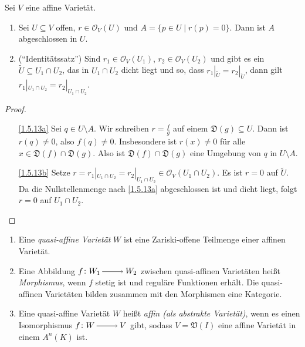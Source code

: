 \documentclass[a4paper,12pt]{scrbook}
\newtheorem{proof}{Beweis}
\def\V{\mathfrak{V}}
\def\O{\mathcal{O}}
\newcommand{\D}{\mathfrak{D}}
\newcommand{\restrict}[1]{|_{#1}}
\newcommand{\ra}{\raisebox{-1pt}{\tikz{\draw[thin,shorten >=3pt, ->] (0,0) node{\hspace*{-2pt}} -- node{} (1,0);}}\penalty1000\relax}
\begin{document}
\begin{bem}\label{1.5.13}
  Sei $V$ eine affine Varietät.
  \begin{enumerate}
  \item{} Sei $U\subseteq V$ offen, $r\in\O_V(U)$ und $A=\{p\in U\mid r(p)=0\}$. Dann ist $A$ abgeschlossen in $U$.
  \item{} (\enquote{Identitätssatz}) Sind $r_1\in\O_V(U_1)$, $r_2\in\O_V(U_2)$ und gibt es ein $\tilde{U}\subseteq
    U_1\cap U_2$, das in $U_1\cap U_2$ dicht liegt und so, dass $r_1\restrict{\tilde{U}}=r_2\restrict{\tilde{U}}$, dann gilt
    $r_1\restrict{U_1\cap U_2}=r_2\restrict{U_1\cap U_2}$.
  \end{enumerate}
\end{bem}
\begin{proof}
  \begin{enumerate}
  \item[\ref{1.5.13a}] Sei $q\in U\setminus A$. Wir schreiben $r=\frac{f}{g}$ auf einem $\D(g)\subseteq U$. Dann ist $r(q)\neq0$,
    also $f(q)\neq0$. Insbesondere ist $r(x)\neq0$ für alle $x\in \D(f)\cap \D(g)$. Also ist $\D(f)\cap \D(g)$ eine Umgebung von $q$
    in $U\setminus A$.
  \item[\ref{1.5.13b}] Setze $r=r_1\restrict{U_1\cap U_2}=r_2\restrict{U_1\cap U_2}\in \O_V(U_1\cap U_2)$. Es ist $r=0$ auf
    $\tilde{U}$. Da die Nullstellenmenge nach \ref{1.5.13a} abgeschlossen ist und dicht liegt, folgt $r=0$ auf $U_1\cap U_2$.
  \end{enumerate}
\end{proof}

\begin{db}\label{1.5.14}
  \begin{enumerate}
  \item{} Eine \emph{quasi-affine Varietät} $W$ ist eine Zariski-offene Teilmenge einer affinen Varietät.
  \item{} Eine Abbildung $f\colon W_1\ra W_2$ zwischen quasi-affinen Varietäten heißt \emph{Morphismus}, wenn $f$
    stetig ist und reguläre Funktionen erhält. Die quasi-affinen Varietäten bilden zusammen mit den Morphismen eine Kategorie.
  \item{} Eine quasi-affine Varietät $W$ heißt \emph{affin (als abstrakte Varietät)}, wenn es einen Isomorphismus
    $f\colon W\ra V$ gibt, sodass $V=\V(I)$ eine affine Varietät in einem $A^n(K)$ ist.
  \end{enumerate}
\end{db}
\end{document}
